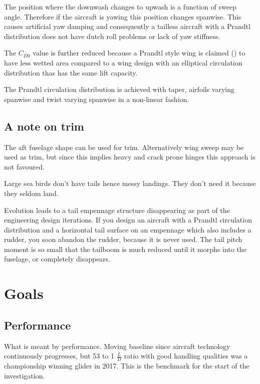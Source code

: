 \documentclass{report}
\begin{document}
The position where the downwash changes to upwash is a function of sweep angle.  Therefore if the aircraft is yawing this position changes spanwise.  This causes artificial yaw damping and consequently a tailless aircraft with a Prandtl distribution does not have dutch roll problems or lack of yaw stiffness.

The $C_{D0}$ value is further reduced because a Prandtl style wing is claimed (\cite{PrandtlPatent}) to have less wetted area compared to a wing design with an elliptical circulation distribution thas has the same lift capacity.

The Prandtl circulation distribution is achieved with taper, airfoils varying spanwise and twist varying spanwise in a non-linear fashion.


\subsection{A note on trim}


The aft fuselage shape can be used for trim.  Alternatively wing sweep may be used as trim, but since this implies heavy and crack prone hinges this approach is not favoured.

Large sea birds don't have tails hence messy landings.  They don't need it because they seldom land.

Evolution leads to a tail empennage structure disappearing as part of the engineering design iterations.  If you design an aircraft with a Prandtl circulation distribution and a horizontal tail surface on an empennage which also includes a rudder, you soon abandon the rudder, because it is never used.  The tail pitch moment is so small that the tailboom is much reduced until it morphs into the fuselage, or completely disappears.


\section{Goals}

\subsection{Performance}

What is meant by performance. Moving baseline since aircraft technology continuously progresses, but 53 to 1 $\frac{L}{D}$ ratio with good handling qualities was a championship winning glider in 2017.  This is the benchmark for the start of the investigation.
\end{document}
